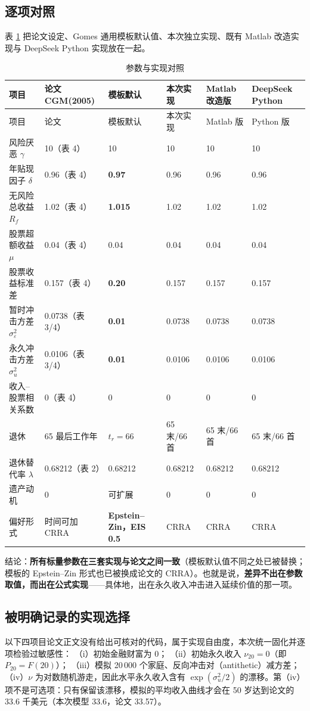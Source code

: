 \documentclass[UTF8,a4paper,11pt,fontset=fandol]{ctexart}
\newcommand{\su}{\sigma_u^2}
\newcommand{\se}{\sigma_\varepsilon^2}
\begin{document}
\subsection{逐项对照}
表 \ref{tab:params} 把论文设定、Gomes 通用模板默认值、本次独立实现、既有 Matlab 改造实现与 DeepSeek Python 实现放在一起。

\begin{longtable}{@{}p{}p{}p{}p{}p{}p{}@{}}
\caption{参数与实现对照}\label{tab:params}\\\toprule
项目 & 论文 CGM(2005) & 模板默认 & 本次实现 & Matlab 改造版 & DeepSeek Python\\\midrule
\endfirsthead\toprule
项目 & 论文 & 模板默认 & 本次实现 & Matlab 版 & Python 版\\\midrule\endhead
风险厌恶 \(\gamma\) & 10（表 4） & 10 & 10 & 10 & 10\\
年贴现因子 \(\delta\) & 0.96（表 4） & \textbf{0.97} & 0.96 & 0.96 & 0.96\\
无风险总收益 \(R_f\) & 1.02（表 4） & \textbf{1.015} & 1.02 & 1.02 & 1.02\\
股票超额收益 \(\mu\) & 0.04（表 4） & 0.04 & 0.04 & 0.04 & 0.04\\
股票收益标准差 & 0.157（表 4） & \textbf{0.20} & 0.157 & 0.157 & 0.157\\
暂时冲击方差 \(\se\) & 0.0738（表 3/4） & \textbf{0.01} & 0.0738 & 0.0738 & 0.0738\\
永久冲击方差 \(\su\) & 0.0106（表 3/4） & \textbf{0.01} & 0.0106 & 0.0106 & 0.0106\\
收入--股票相关系数 & 0（表 4） & 0 & 0 & 0 & 0\\
退休 & 65 最后工作年 & \(t_r=66\) & 65 末/66 首 & 65 末/66 首 & 65 末/66 首\\
退休替代率 \(\lambda\) & 0.68212（表 2） & 0.68212 & 0.68212 & 0.68212 & 0.68212\\
遗产动机 & 0 & 可扩展 & 0 & 0 & 0\\
偏好形式 & 时间可加 CRRA & \textbf{Epstein--Zin，EIS 0.5} & CRRA & CRRA & CRRA\\
\bottomrule
\end{longtable}

结论：\textbf{所有标量参数在三套实现与论文之间一致}（模板默认值不同之处已被替换；模板的 Epstein--Zin 形式也已被换成论文的 CRRA）。也就是说，\textbf{差异不出在参数取值，而出在公式实现}——具体地，出在永久收入冲击进入延续价值的那一项。

\subsection{被明确记录的实现选择}
以下四项目论文正文没有给出可核对的代码，属于实现自由度，本次统一固化并逐项检验过敏感性：
（i）初始金融财富为 0；
（ii）初始永久收入 \(\nu_{20}=0\)（即 \(P_{20}=F(20)\)）；
（iii）模拟 20\,000 个家庭、反向冲击对（antithetic）减方差；
（iv）\(\nu\) 为对数随机游走，因此水平永久收入含有 \(\exp(\su/2)\) 的漂移。第（iv）项不是可选项：只有保留该漂移，模拟的平均收入曲线才会在 50 岁达到论文的 33.6 千美元（本次模型 33.6，论文 33.57）。
\end{document}
